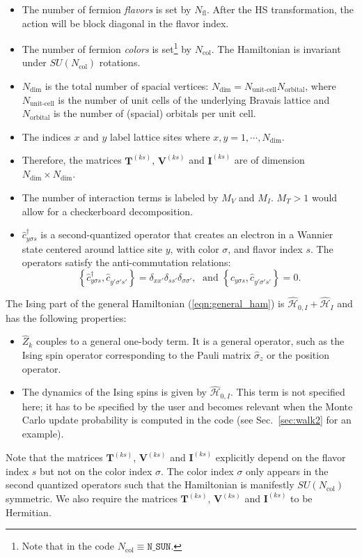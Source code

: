 \begin{itemize}
\item The number of fermion \emph{flavors} is set by $N_{\mathrm{fl}}$.  After the HS transformation, the action will be block diagonal in the flavor index. 
\item The number of fermion \emph{colors} is set\footnote{Note that  in the code $ N_{\mathrm{col}} \equiv \texttt{N\_{SUN}} $.} by $N_{\mathrm{col}}$.    The Hamiltonian is invariant under  $SU(N_{\mathrm{col}})$  rotations. 
\item $N_{\mathrm{dim}}$ is the total number of spacial vertices: $N_{\mathrm{dim}}=N_{\text{unit-cell}} N_{\mathrm{orbital}}$, where $N_{\text{unit-cell}}$ is the number of unit cells of the underlying Bravais lattice and $N_{\mathrm{orbital}}$ is the number of (spacial) orbitals per unit cell.
\item The indices $x$ and $y$ label lattice sites where $x,y=1,\cdots, N_{\mathrm{dim}}$. 
\item Therefore, the  matrices $\bm{T}^{(k s)}$, $\bm{V}^{(ks)}$  and $\bm{I}^{(ks)}$ are  of dimension $N_{\mathrm{dim}}\times N_{\mathrm{dim}}$.
\item The number of interaction terms  is labeled by $M_V$   and $M_I$.   $M_T> 1 $ would allow for a checkerboard decomposition.
\item $\hat{c}^{\dagger}_{y \sigma s} $ is a second-quantized operator that creates an electron in a Wannier state centered around lattice site $y$, with color $\sigma$, and  flavor index $s$.  The operators satisfy the anti-commutation relations: 
\begin{equation}
	\left\{ \hat{c}^{\dagger}_{y \sigma s},    \hat{c}^{\phantom\dagger}_{y' \sigma' s'}  \right\}   =   \delta_{xx'}  \delta_{ss'} \delta_{\sigma\sigma'},   
	\; \text{ and } \left\{ \hat{c}^{\phantom\dagger}_{y \sigma s},    \hat{c}^{\phantom\dagger}_{y' \sigma' s'}  \right\}   =0.
\end{equation}

\end{itemize}
The Ising part of the general Hamiltonian (\ref{eqn:general_ham}) is $\hat{\mathcal{H}}_{0,I}+ \hat{\mathcal{H}}_{I}$ and  has the following properties:
\begin{itemize}
\item $\hat{Z}_k$ couples to a general one-body term. It is a general operator, such as the Ising spin operator corresponding to the Pauli matrix $\hat{\sigma}_{z}$ or the position operator.
\item  The dynamics of the Ising spins is given by $\hat{\mathcal{H}}_{0,I}$. This term is not specified here; 
it has to be specified by the user and becomes relevant when the Monte Carlo update probability is computed in the code (see Sec.~\ref{sec:walk2} for an example).
\end{itemize}
Note that the matrices  $\bm{T}^{(ks)}$,  $\bm{V}^{(ks)}$ and  $\bm{I}^{(ks)}$ explicitly depend on the flavor index $s$ but not on the color index $\sigma$. 
The color index $\sigma$ only appears in  the  second quantized operators such that the Hamiltonian is manifestly $SU(N_{\mathrm{col}})$    symmetric.  We also require
the matrices $\bm{T}^{(ks)}$,  $\bm{V}^{(ks)}$ and  $\bm{I}^{(ks)}$  to be  Hermitian.

